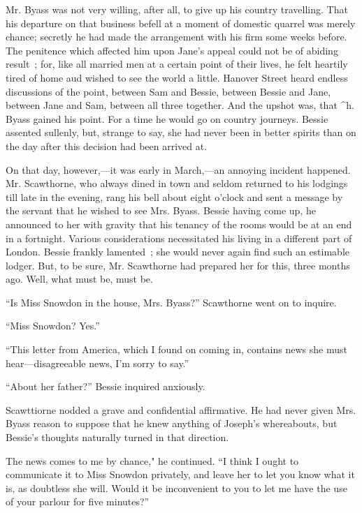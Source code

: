 Mr. Byass was not very willing, after all, to give up his country
travelling. That his departure on that business befell at a moment of
domestic quarrel was merely chance; secretly he had made the arrangement
with his firm some weeks before. The penitence which affected him upon
Jane's appeal could not be of abiding result~; for, like all married men
at a certain point of their lives, he felt heartily tired of home aud
wished to see the world a little. Hanover Street heard endless
discussions of the point, between Sam and Bessie, between Bessie and
Jane, between Jane and Sam, between all three together. And the upshot
was, that \^{}h. Byass gained his point. For a time he would go on
country journeys. {\protect\hypertarget{303}{}{}} Bessie assented
sullenly, but, strange to say, she had never been in better spirits than
on the day after this decision had been arrived at.

On that day, however,---it was early in March,---an annoying incident
happened. Mr. Scawthorne, who always dined in town and seldom returned
to his lodgings till late in the evening, rang his bell about eight
o'clock and sent a message by the servant that he wished to see Mrs.
Byass. Bessie having come up, he announced to her with gravity that his
tenancy of the rooms would be at an end in a fortnight. Various
considerations necessitated his living in a different part of London.
Bessie frankly lamented~; she would never again find such an estimable
lodger. But, to be sure, Mr. Scawthorne had prepared her for this, three
months ago. Well, what must be, must be.

``Is Miss Snowdon in the house, Mrs. Byass?'' Scawthorne went on to
inquire.

``Miss Snowdon? Yes.''

``This letter from America, which I found on coming in, contains news
she must hear---disagreeable news, I'm sorry to say.''

``About her father?'' Bessie inquired anxiously.

{\protect\hypertarget{304}{}{}} Scawttiorne nodded a grave and
confidential affirmative. He had never given Mrs. Byass reason to
suppose that he knew anything of Joseph's whereabouts, but Bessie's
thoughts naturally turned in that direction.

The news comes to me by chance," he continued. ``I think I ought to
communicate it to Miss Snowdon privately, and leave her to let you know
what it is, as doubtless she will. Would it be inconvenient to you to
let me have the use of your parlour for five minutes?''

